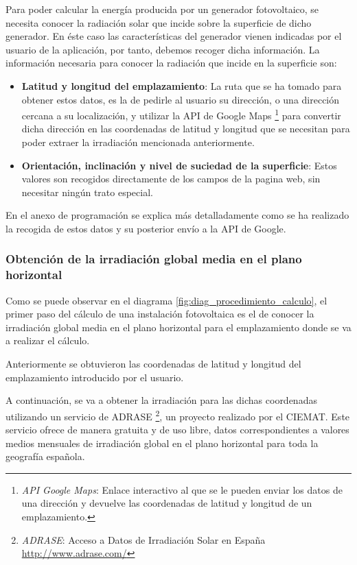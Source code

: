 Para poder calcular la energía producida por un generador fotovoltaico, se necesita conocer la radiación solar que incide sobre la superficie de dicho generador. En éste caso las características del generador vienen indicadas por el usuario de la aplicación, por tanto, debemos recoger dicha información. La información necesaria para conocer la radiación que incide en la superficie son:
\begin{itemize}
\item \textbf{Latitud y longitud del emplazamiento}: La ruta que se ha tomado para obtener estos datos, es la de pedirle al usuario su dirección, o una dirección cercana a su localización, y utilizar la API de Google Maps \footnote{\textit{API Google Maps}: Enlace interactivo al que se le pueden enviar los datos de una dirección y devuelve las coordenadas de latitud y longitud de un emplazamiento.  } para convertir dicha dirección en las coordenadas de latitud y longitud que se necesitan para poder extraer la irradiación mencionada anteriormente.\\
\item \textbf{Orientación, inclinación y nivel de suciedad de la superficie}: Estos valores son recogidos directamente de los campos de la pagina web, sin necesitar ningún trato especial.
\end{itemize} 
En el anexo de programación se explica más detalladamente como se ha realizado la recogida de estos datos y su posterior envío a la API de Google.

\subsubsection{Obtención de la irradiación global media en el plano horizontal}
\label{section:get_global_rad}

Como se puede observar en el diagrama \ref{fig:diag_procedimiento_calculo}, el primer paso del cálculo de una instalación fotovoltaica es el de conocer la irradiación global media en el plano horizontal para el emplazamiento donde se va a realizar el cálculo.

 Anteriormente se obtuvieron las coordenadas de latitud y longitud del emplazamiento introducido por el usuario.

A continuación, se va a obtener la irradiación para las dichas coordenadas utilizando un servicio de ADRASE \footnote{\textit{ADRASE}: Acceso a Datos de Irradiación Solar en España \url{http://www.adrase.com/}}, un proyecto realizado por el CIEMAT. Este servicio ofrece de manera gratuita y de uso libre, datos correspondientes a valores medios mensuales de irradiación global en el plano horizontal para toda la geografía española.

